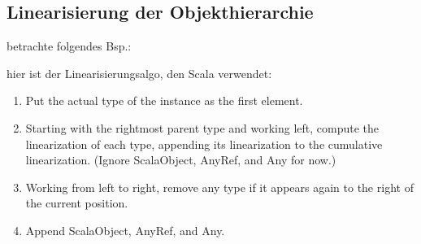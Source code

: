 \subsection{Linearisierung der Objekthierarchie}
betrachte folgendes Bsp.:




hier ist der Linearisierungsalgo, den Scala verwendet:

\begin{enumerate}
  \item Put the actual type of the instance as the first element.
  \item Starting with the rightmost parent type and working left, compute the linearization
of each type, appending its linearization to the cumulative linearization. (Ignore
ScalaObject, AnyRef, and Any for now.)
  \item Working from left to right, remove any type if it appears again to the right of the
current position.
  \item Append ScalaObject, AnyRef, and Any.
\end{enumerate}
\pagebreak


